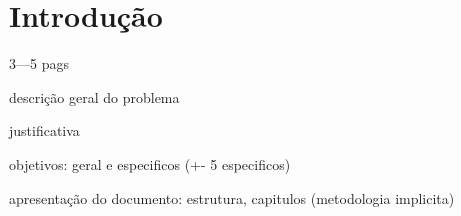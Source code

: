 
\chapter{Introdução}
3---5 pags

descrição geral do problema

justificativa

objetivos: geral e especificos (+- 5 especificos)

apresentação do documento: estrutura, capitulos (metodologia implicita)
